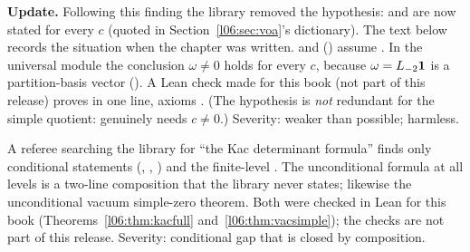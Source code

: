 \begin{warning}[title={Redundant hypothesis $c\ne0$ (since removed from \texttt{omegaVir\_ne\_zero})}]\label{l06:warn:omega}
\textbf{Update.} Following this finding the library removed the hypothesis:  and
 are now stated for every $c$ (quoted in Section~\ref{l06:sec:voa}'s dictionary). The text below records the situation when the chapter
was written.
\allowbreak{}\allowbreak{}\allowbreak{} and \allowbreak{}\allowbreak{}\allowbreak{}\allowbreak{}
() assume . In the universal module the conclusion
$\omega\ne0$ holds for every $c$, because $\omega = L_{-2}\mathbf{1}$ is a partition-basis vector
(). A Lean check made for this book (not part of this release) proves
\allowbreak{}\allowbreak{}\allowbreak{} in one line, axioms \lean{[propext, Classical.}\allowbreak{}\allowbreak\lean{sound]}. (The hypothesis is \emph{not} redundant for the simple quotient:
\allowbreak{}\allowbreak{}\allowbreak{} genuinely needs $c\ne0$.) Severity: weaker than possible;
harmless.
\end{warning}

\begin{warning}[title={The Kac determinant is not a library declaration}]\label{l06:warn:kacnotlib}
A referee searching the library for ``the Kac determinant formula'' finds only conditional statements
(\allowbreak{}\allowbreak{}\allowbreak{}\allowbreak{}, \allowbreak{}\allowbreak{}\allowbreak{}\allowbreak{}\allowbreak{},
\allowbreak{}\allowbreak{}) and the finite-level \allowbreak{}\allowbreak{}\allowbreak{}\allowbreak{}.
The unconditional formula at all levels is a two-line composition that the library never states; likewise the
unconditional vacuum simple-zero theorem. Both were checked in Lean for this book (Theorems~\ref{l06:thm:kacfull} and~\ref{l06:thm:vacsimple}); the checks are
not part of this release. Severity: conditional gap
that is closed by composition.
\end{warning}

